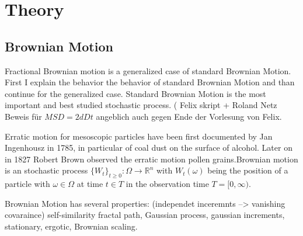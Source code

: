 \documentclass[
  a4paper,BCOR10mm,oneside,
  bibtotoc,idxtotoc,
  headsepline,footsepline,%
  fleqn,openbib
]{scrbook}
\begin{document}
\chapter{Theory}
\section{Brownian Motion}
Fractional Brownian motion is a generalized case of standard Brownian Motion. First I explain the behavior the behavior of standard Brownian Motion and than continue for the generalized case. \newline
Standard Brownian Motion is the most important and best studied stochastic process. \newline( Felix skript + Roland Netz Beweis für $MSD= 2dDt$ angeblich auch gegen Ende der Vorlesung von Felix.\newline

Erratic motion for mesoscopic particles have been first documented by Jan Ingenhousz in 1785, in particular of coal dust on the surface of alcohol. Later on in 1827 Robert Brown observed the erratic motion pollen grains.\newline Brownian motion is an stochastic process $ \{ W_t \}_{t\geq0}: \Omega \rightarrow \mathbb{R}^n$ with $ W_t(\omega)$ being the position of a particle with $\omega \in \Omega$ at time $t \in T$ in the observation time $T =[0, \infty)$. 


Brownian Motion has several properties: (independet inceremnts --> vanishing covaraince) self-similarity fractal path, Gaussian process, gaussian increments, stationary, ergotic, Brownian scaling. 
\end{document}
